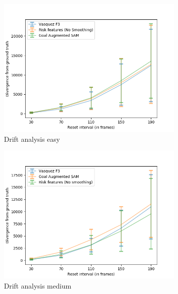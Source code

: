 \begin{figure}[htbp]
	\begin{subfigure}{0.5\textwidth}
		\centering
		\includegraphics[width=\linewidth]{plots/inter_IRL/drift_analysis_easy.png}
		\caption {Drift analysis easy}
		\label{fig:inter_IRL-drift_analysis_easy}
	\end{subfigure}
	\begin{subfigure}{0.5\textwidth}
		\centering
		\includegraphics[width=\linewidth]{plots/inter_IRL/drift_analysis_med.png}
		\caption {Drift analysis medium}
		\label{fig:inter_IRL-drift_analysis_med}
	\end{subfigure}
	\begin{subfigure}{0.5\textwidth}

\end{subfigure}
\end{figure}
